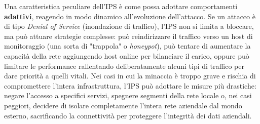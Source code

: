 \documentclass{article}
\begin{document}
Una caratteristica peculiare dell'IPS è come possa adottare comportamenti \textbf{adattivi}, reagendo in modo dinamico all'evoluzione dell'attacco. Se un attacco è di tipo \textit{Denial of Service} (inondazione di traffico), l'IPS non si limita a bloccare, ma può attuare strategie complesse: può reindirizzare il traffico verso un host di monitoraggio (una sorta di "trappola" o \textit{honeypot}), può tentare di aumentare la capacità della rete aggiungendo host online per bilanciare il carico, oppure può limitare le performance rallentando deliberatamente alcuni tipi di traffico per dare priorità a quelli vitali. Nei casi in cui la minaccia è troppo grave e rischia di compromettere l'intera infrastruttura, l'IPS può adottare le misure più drastiche: negare l'accesso a specifici servizi, spegnere segmenti della rete locale o, nei casi peggiori, decidere di isolare completamente l'intera rete aziendale dal mondo esterno, sacrificando la connettività per proteggere l'integrità dei dati aziendali.
\end{document}
